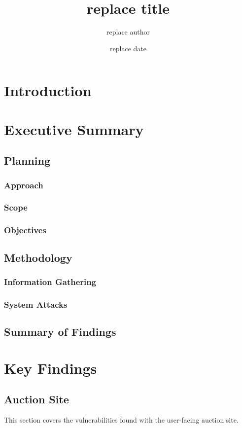 \documentclass{report}
\title{replace title}
\author{replace author}
\date{replace date}
\begin{document}
\maketitle
\tableofcontents
\listoffigures

\chapter{Introduction}

\chapter{Executive Summary}
\section{Planning}
\subsection{Approach}
\subsection{Scope}
\subsection{Objectives}
\section{Methodology}
\subsection{Information Gathering}
\subsection{System Attacks}
\section{Summary of Findings}

\chapter{Key Findings}


\section{Auction Site}
This section covers the vulnerabilities found with the user-facing auction site.
\end{document}
